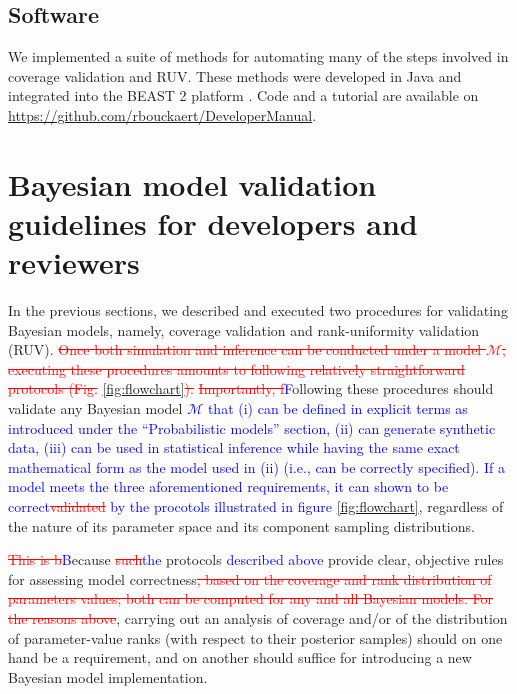 \documentclass[oneside]{article}
\begin{document}
\subsection*{Software}

We implemented a suite of methods for automating many of the steps involved in coverage validation and RUV.
These methods were developed in Java and integrated into the BEAST 2 platform \citep{beast25}.
Code and a tutorial are available on \href{https://github.com/rbouckaert/DeveloperManual}{https://github.com/rbouckaert/DeveloperManual}.

\section*{Bayesian model validation guidelines for developers and reviewers}

In the previous sections, we described and executed two procedures for validating Bayesian models, namely, coverage validation and rank-uniformity validation (RUV).
\textcolor{red}{\st{Once both simulation and inference can be conducted under a model $\mathcal{M}$, executing these procedures amounts to following relatively straightforward protocols (Fig.}} \ref{fig:flowchart}\textcolor{red}{\st{).}}
\textcolor{red}{\st{Importantly, f}}\textcolor{blue}{F}ollowing these procedures should validate any Bayesian model \textcolor{blue}{$\mathcal{M}$ that (i) can be defined in explicit terms as introduced under the ``Probabilistic models'' section, (ii) can generate synthetic data, (iii) can be used in statistical inference while having the same exact mathematical form as the model used in (ii) (i.e., can be correctly specified).
If a model meets the three aforementioned requirements, it can shown to be correct\textcolor{red}{\st{validated}} by the procotols illustrated in figure} \ref{fig:flowchart}, regardless of the nature of its parameter space and its component sampling distributions.

\textcolor{red}{\st{This is b}}\textcolor{blue}{B}ecause \textcolor{red}{\st{such}}\textcolor{blue}{the} protocols \textcolor{blue}{described above} provide clear, objective rules for assessing model correctness\textcolor{red}{\st{, based on the coverage and rank distribution of parameters values; both can be computed for any and all Bayesian models. For the reasons above}}, carrying out an analysis of coverage and/or of the distribution of parameter-value ranks (with respect to their posterior samples) should on one hand be a requirement, and on another should suffice for introducing a new Bayesian model implementation.
\end{document}
